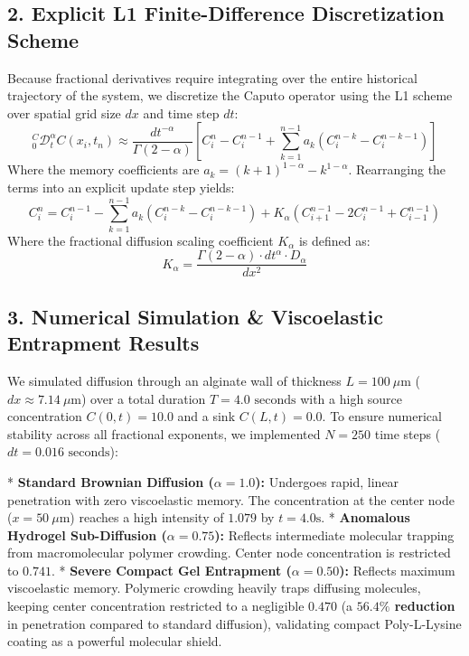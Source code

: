 \documentclass[11pt,twocolumn]{article}
\begin{document}
\subsection{2. Explicit L1 Finite-Difference Discretization Scheme}
Because fractional derivatives require integrating over the entire historical trajectory of the system, we discretize the Caputo operator using the L1 scheme over spatial grid size $dx$ and time step $dt$:
$${}_0^{C}\mathcal{D}_t^\alpha C(x_i, t_n) \approx \frac{dt^{-\alpha}}{\Gamma(2-\alpha)} \left[ C_i^n - C_i^{n-1} + \sum_{k=1}^{n-1} a_k \left( C_i^{n-k} - C_i^{n-k-1} \right) \right]$$
Where the memory coefficients are $a_k = (k+1)^{1-\alpha} - k^{1-\alpha}$. Rearranging the terms into an explicit update step yields:
$$C_i^n = C_i^{n-1} - \sum_{k=1}^{n-1} a_k \left( C_i^{n-k} - C_i^{n-k-1} \right) + K_\alpha \left( C_{i+1}^{n-1} - 2 C_i^{n-1} + C_{i-1}^{n-1} \right)$$
Where the fractional diffusion scaling coefficient $K_\alpha$ is defined as:
$$K_\alpha = \frac{\Gamma(2-\alpha) \cdot dt^\alpha \cdot D_\alpha}{dx^2}$$

\subsection{3. Numerical Simulation & Viscoelastic Entrapment Results}
We simulated diffusion through an alginate wall of thickness $L = 100\ \mu\text{m}$ ($dx \approx 7.14\ \mu\text{m}$) over a total duration $T = 4.0\text{ seconds}$ with a high source concentration $C(0, t) = 10.0$ and a sink $C(L, t) = 0.0$. To ensure numerical stability across all fractional exponents, we implemented $N = 250$ time steps ($dt = 0.016\text{ seconds}$):

*   \textbf{Standard Brownian Diffusion ($\alpha = 1.0$):} Undergoes rapid, linear penetration with zero viscoelastic memory. The concentration at the center node ($x = 50\ \mu\text{m}$) reaches a high intensity of \textbf{$1.079$} by $t = 4.0\text{s}$.
*   \textbf{Anomalous Hydrogel Sub-Diffusion ($\alpha = 0.75$):} Reflects intermediate molecular trapping from macromolecular polymer crowding. Center node concentration is restricted to \textbf{$0.741$}.
*   \textbf{Severe Compact Gel Entrapment ($\alpha = 0.50$):} Reflects maximum viscoelastic memory. Polymeric crowding heavily traps diffusing molecules, keeping center concentration restricted to a negligible \textbf{$0.470$} (a \textbf{$56.4\%$ reduction} in penetration compared to standard diffusion), validating compact Poly-L-Lysine coating as a powerful molecular shield.
\end{document}
